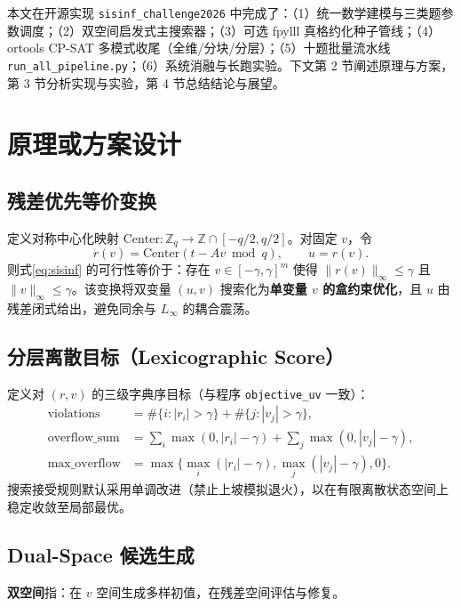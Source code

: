 \documentclass[12pt,a4paper]{ctexart}
\begin{document}
本文在开源实现 \texttt{sisinf\_challenge2026} 中完成了：（1）统一数学建模与三类题参数调度；（2）双空间启发式主搜索器；（3）可选 fpylll 真格约化种子管线；（4）ortools CP-SAT 多模式收尾（全维/分块/分层）；（5）十题批量流水线 \texttt{run\_all\_pipeline.py}；（6）系统消融与长跑实验。下文第 2 节阐述原理与方案，第 3 节分析实现与实验，第 4 节总结结论与展望。

\section{原理或方案设计}

\subsection{残差优先等价变换}

定义对称中心化映射 $\mathrm{Center}:\mathbb{Z}_q\to\mathbb{Z}\cap[-q/2,q/2]$。对固定 $v$，令
\begin{equation}
  r(v)=\mathrm{Center}(t-Av\bmod q),\qquad u=r(v).
\end{equation}
则式\eqref{eq:sisinf} 的可行性等价于：存在 $v\in[-\gamma,\gamma]^m$ 使得 $\|r(v)\|_{\infty}\le\gamma$ 且 $\|v\|_{\infty}\le\gamma$。该变换将双变量 $(u,v)$ 搜索化为\textbf{单变量 $v$ 的盒约束优化}，且 $u$ 由残差闭式给出，避免同余与 $L_{\infty}$ 的耦合震荡。

\subsection{分层离散目标（Lexicographic Score）}

定义对 $(r,v)$ 的三级字典序目标（与程序 \texttt{objective\_uv} 一致）：
\begin{align*}
  \text{violations} &= \#\{i:|r_i|>\gamma\}+\#\{j:|v_j|>\gamma\},\\
  \text{overflow\_sum} &= \sum_i\max(0,|r_i|-\gamma)+\sum_j\max(0,|v_j|-\gamma),\\
  \text{max\_overflow} &= \max\bigl\{\max_i(|r_i|-\gamma),\max_j(|v_j|-\gamma),0\bigr\}.
\end{align*}
搜索接受规则默认采用单调改进（禁止上坡模拟退火），以在有限离散状态空间上稳定收敛至局部最优。

\subsection{Dual-Space 候选生成}

\textbf{双空间}指：在 $v$ 空间生成多样初值，在残差空间评估与修复。
\end{document}
